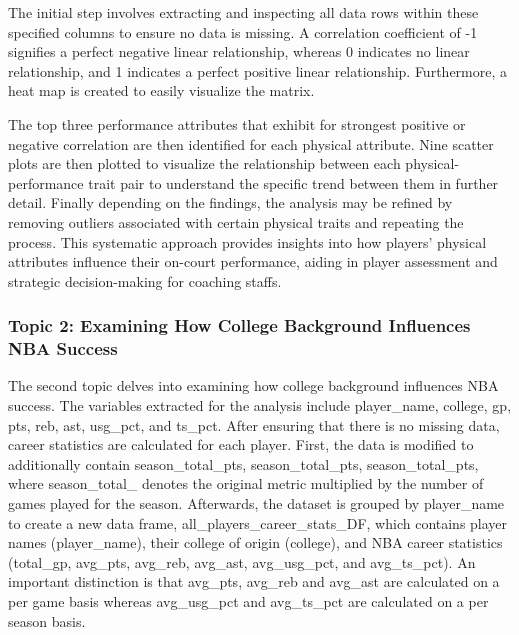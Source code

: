 \documentclass[
]{article}
\begin{document}
The initial step involves extracting and inspecting all data rows within
these specified columns to ensure no data is missing. A correlation
coefficient of -1 signifies a perfect negative linear relationship,
whereas 0 indicates no linear relationship, and 1 indicates a perfect
positive linear relationship. Furthermore, a heat map is created to
easily visualize the matrix.

The top three performance attributes that exhibit for strongest positive
or negative correlation are then identified for each physical attribute.
Nine scatter plots are then plotted to visualize the relationship
between each physical-performance trait pair to understand the specific
trend between them in further detail. Finally depending on the findings,
the analysis may be refined by removing outliers associated with certain
physical traits and repeating the process. This systematic approach
provides insights into how players' physical attributes influence their
on-court performance, aiding in player assessment and strategic
decision-making for coaching staffs.

\hypertarget{topic-2-examining-how-college-background-influences-nba-success}{%
\subsubsection{\texorpdfstring{\textbf{Topic 2: Examining How College
Background Influences NBA
Success}}{Topic 2: Examining How College Background Influences NBA Success}}\label{topic-2-examining-how-college-background-influences-nba-success}}

The second topic delves into examining how college background influences
NBA success. The variables extracted for the analysis include
player\_name, college, gp, pts, reb, ast, usg\_pct, and ts\_pct. After
ensuring that there is no missing data, career statistics are calculated
for each player. First, the data is modified to additionally contain
season\_total\_pts, season\_total\_pts, season\_total\_pts, where
season\_total\_ denotes the original metric multiplied by the number of
games played for the season. Afterwards, the dataset is grouped by
player\_name to create a new data frame,
all\_players\_career\_stats\_DF, which contains player names
(player\_name), their college of origin (college), and NBA career
statistics (total\_gp, avg\_pts, avg\_reb, avg\_ast, avg\_usg\_pct, and
avg\_ts\_pct). An important distinction is that avg\_pts, avg\_reb and
avg\_ast are calculated on a per game basis whereas avg\_usg\_pct and
avg\_ts\_pct are calculated on a per season basis.
\end{document}
